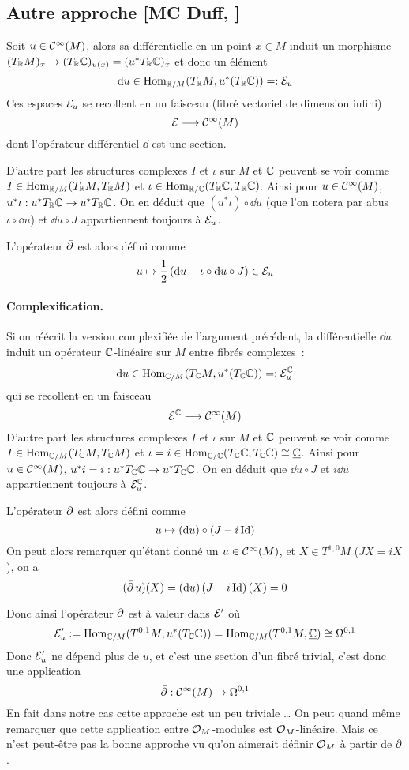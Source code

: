\documentclass[12pt,draft]{article}
\begin{document}
\subsection{Autre approche [MC Duff, \cite{McDuff}] }
Soit $u \in \mathcal{C}^\infty(M)$, alors sa différentielle en un point $x \in M$ induit un morphisme $(T_{\mathbb{R}} M)_x \rightarrow (T_{\mathbb{R}}\mathbb{C})_{u(x)} = (u^*T_{\mathbb{R}} \mathbb{C})_x$ et donc un élément \question \[
\operatorname{d\!} u \in \text{Hom}_{\mathbb{R}/M}(T_{\mathbb{R}} M , u^*(T_{\mathbb{R}} \mathbb{C})) =: \mathcal{E}_u
\]
Ces espaces $\mathcal{E}_u$ se recollent en un faisceau (fibré vectoriel de dimension infini)
\[
\mathcal{E} \longrightarrow \mathcal{C}^\infty(M)
\]
dont l'opérateur différentiel \og  $\dd$ \fg{} est une section.

D'autre part les structures complexes $I$ et $\iota$ sur $M$ et $\mathbb{C}$ peuvent se voir comme $I \in \text{Hom}_{\mathbb{R}/M}(T_{\mathbb{R}} M, T_{\mathbb{R}} M)$ et $\iota \in \text{Hom}_{\mathbb{R}/\mathbb{C}}(T_{\mathbb{R}} \mathbb{C}, T_{\mathbb{R}} \mathbb{C})$. Ainsi pour $u \in \mathcal{C}^\infty(M)$, $u^*\iota : u^*T_{\mathbb{R}} \mathbb{C} \rightarrow u^*T_{\mathbb{R}} \mathbb{C}$.
On en déduit que $(u^* \iota) \circ \dd u$ (que l'on notera par abus $\iota \circ \dd u$) et $\dd u \circ J$ appartiennent toujours à $\mathcal{E}_u$.

L’opérateur $\operatorname{\bar{\partial}}$ est alors défini comme
\[
u \mapsto \operatorname{\frac{1}{2}} \left(
\operatorname{d\!} u + \iota \circ \operatorname{d\!} u \circ J
\right) \in \mathcal{E}_u
\]

\paragraph*{Complexification.}
Si on réécrit la version complexifiée de l'argument précédent, la différentielle $\dd u$ induit un opérateur $\mathbb{C}$-linéaire sur $M$ entre fibrés complexes~:
\[
\operatorname{d\!} u \in \text{Hom}_{\mathbb{C}/M}(T_{\mathbb{C}} M , u^*(T_{\mathbb{C}} \mathbb{C})) =: \mathcal{E}^{\mathbb{C}}_u
\]
qui se recollent en un faisceau
\[
\mathcal{E}^{\mathbb{C}} \longrightarrow \mathcal{C}^\infty(M)
\]
D'autre part les structures complexes $I$ et $\iota$ sur $M$ et $\mathbb{C}$ peuvent se voir comme $I \in \text{Hom}_{\mathbb{C}/M}(T_{\mathbb{C}} M, T_{\mathbb{C}} M)$ et $\iota = i \in \text{Hom}_{\mathbb{C}/\mathbb{C}}(T_{\mathbb{C}} \mathbb{C}, T_{\mathbb{C}} \mathbb{C}) \cong \underline{\mathbb{C}}$. Ainsi pour $u \in \mathcal{C}^\infty(M)$, $u^*i = i : u^*T_{\mathbb{C}} \mathbb{C} \rightarrow u^*T_{\mathbb{C}} \mathbb{C}$.
On en déduit que $\dd u \circ J$ et $i\dd u$ appartiennent toujours à $\mathcal{E}^{\mathbb{C}}_u$.

L’opérateur $\operatorname{\bar{\partial}}$ est alors défini comme
\[
u \mapsto (\operatorname{d\!} u) \circ \left( J - i \operatorname{Id} \right)
\]
On peut alors remarquer qu'étant donné un $u \in \mathcal{C}^\infty(M)$, et $X \in T^{1,0}M$ ($JX = iX$), on a
\[
(\operatorname{\bar{\partial}} u)(X) = (\operatorname{d\!} u)\left( J - i \operatorname{Id} \right)(X) = 0
\]

Donc ainsi l'opérateur $\operatorname{\bar{\partial}}$ est à valeur dans $\mathcal{E}'$ où
\[
\mathcal{E}'_u :=  \text{Hom}_{\mathbb{C}/M}(T^{0,1} M , u^*(T_{\mathbb{C}} \mathbb{C})) = \text{Hom}_{\mathbb{C}/M}(T^{0,1} M , \underline{\mathbb{C}}) \cong \Omega^{0,1}
\]
Donc $\mathcal{E}'_u$ ne dépend plus de $u$, et c'est une section d'un fibré trivial, c'est donc une application
\[
\operatorname{\bar{\partial}} :  \mathcal{C}^\infty(M) \rightarrow \Omega^{0,1}
\]
En fait dans notre cas cette approche est un peu triviale …
On peut quand même remarquer que cette application entre $\mathcal{O}_M$-modules est $\mathcal{O}_M$-linéaire. Mais ce n'est peut-être pas la bonne approche vu qu'on aimerait définir $\mathcal{O}_M$ à partir de $\operatorname{\bar{\partial}}$.
\fi
\end{document}
